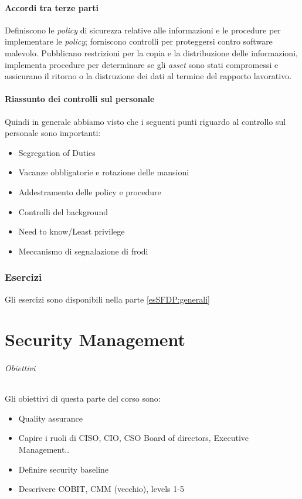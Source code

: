 \subsection{Accordi tra terze parti}

Definiscono le \textit{policy} di sicurezza relative alle informazioni e le 
procedure per implementare le \textit{policy}; forniscono controlli per 
proteggersi contro software malevolo. Pubblicano restrizioni per la copia e la 
distribuzione delle informazioni, implementa procedure per determinare se gli 
\textit{asset} sono stati compromessi e assicurano il ritorno o la distruzione 
dei dati al termine del rapporto lavorativo.

\subsection{Riassunto dei controlli sul personale}

Quindi in generale abbiamo visto che i seguenti punti riguardo al controllo sul 
personale sono importanti:
\begin{itemize}
\item Segregation of Duties
\item Vacanze obbligatorie e rotazione delle mansioni
\item Addestramento delle policy e procedure
\item Controlli del background
\item Need to know/Least privilege
\item Meccanismo di segnalazione di frodi 
\end{itemize}

\section{Esercizi}

Gli esercizi sono disponibili nella parte \ref{esSFDP:generali}

\part{Security Management}
\label{SM}

\paragraph{Obiettivi}

Gli obiettivi di questa parte del corso sono:
\begin{itemize}
\item Quality assurance
\item Capire i ruoli di CISO, CIO, CSO Board of directors, Executive 
Management..
\item Definire security baseline 
\item Descrivere COBIT, CMM (vecchio), levels 1-5
\end{itemize}

